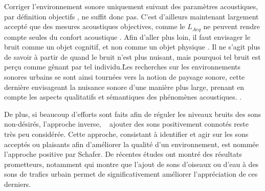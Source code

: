 Corriger l'environnement sonore uniquement suivant des paramètres acoustiques, par définition objectifs , ne suffit donc pas. C'est d'ailleurs maintenant largement accepté que des mesures acoustiques objectives, comme le $L_{Aeq}$ ne peuvent rendre compte seules du confort acoustique \citep{yang2005acoustic,schulte2006soundscape,kang2010semantic,aletta2016soundscape}. Afin d'aller plus loin, il faut envisager le bruit comme un objet cognitif, et non comme un objet physique \citep{guastavino_etude_2003}. Il ne s'agit plus de savoir à partir de quand le bruit n'est plus nuisant, mais pourquoi tel bruit est perçu comme gênant par tel individu.\. Les recherches sur les environnements sonores urbains se sont ainsi tournées vers la notion de paysage sonore, cette dernière envisageant la nuisance sonore d'une manière plus large, prenant en compte les aspects qualitatifs et sémantiques des phénomènes acoustiques.
.

De plus, si beaucoup d’efforts sont faits afin de réguler les niveaux bruits des sons non-désirés,  l'approche inverse, \ie~ ajouter des sons positivement connotés reste très peu considérée. Cette approche, consistant à identifier et agir sur les sons acceptés ou plaisants afin d'améliorer la qualité d'un environnement, est nommée l'approche positive par Schafer. De récentes études ont montré des résultats prometteurs, notamment \citep{hong2013designing} qui montre que l'ajout de sons d'oiseaux ou d'eau à des sons de trafics urbain permet de significativement améliorer l'appréciation de ces derniers. \\

\\

